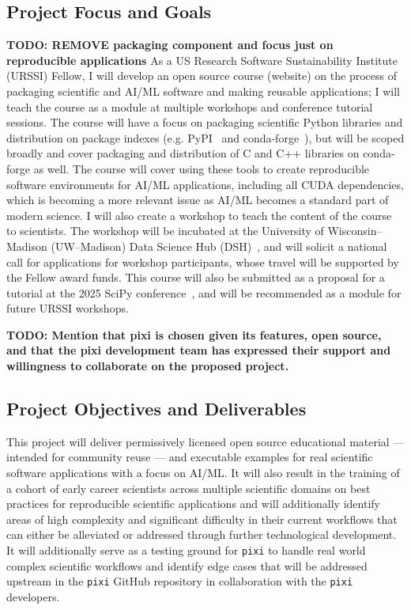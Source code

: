 \documentclass[letterpaper, 11pt]{article}
\newcommand{\institute}{UW--Madison}
\newcommand{\fullinstitute}{University of Wisconsin--Madison}
\newcommand{\fullprogram}{US Research Software Sustainability Institute}
\newcommand{\program}{URSSI}
\begin{document}
\subsection{Project Focus and Goals}
\textbf{TODO: REMOVE packaging component and focus just on reproducible applications}
As a \fullprogram{} (\program{}) Fellow, I will develop an open source course (website) on the process of packaging scientific and AI/ML software and making reusable applications; I will teach the course as a module at multiple workshops and conference tutorial sessions.
The course will have a focus on packaging scientific Python libraries and distribution on package indexes (e.g. PyPI~\cite{PyPI_website} and conda-forge~\cite{conda-forge_community}), but will be scoped broadly and cover packaging and distribution of C and C++ libraries on conda-forge as well.
The course will cover using these tools to create reproducible software environments for AI/ML applications, including all CUDA dependencies, which is becoming a more relevant issue as AI/ML becomes a standard part of modern science.
I will also create a workshop to teach the content of the course to scientists.
The workshop will be incubated at the \fullinstitute{} (\institute{}) Data Science Hub (DSH)~\cite{data_science_hub}, and will solicit a national call for applications for workshop participants, whose travel will be supported by the Fellow award funds.
This course will also be submitted as a proposal for a tutorial at the 2025 SciPy conference~\cite{scipy-2025}, and will be recommended as a module for future URSSI workshops.

\textbf{TODO: Mention that pixi is chosen given its features, open source, and that the pixi development team has expressed their support and willingness to collaborate on the proposed project.}

\subsection{Project Objectives and Deliverables}
This project will deliver permissively licensed open source educational material --- intended for community reuse --- and executable examples for real scientific software applications with a focus on AI/ML.
It will also result in the training of a cohort of early career scientists across multiple scientific domains on best practices for reproducible scientific applications and will additionally identify areas of high complexity and significant difficulty in their current workflows that can either be alleviated or addressed through further technological development.
It will additionally serve as a testing ground for \texttt{pixi} to handle real world complex scientific workflows and identify edge cases that will be addressed upstream in the \texttt{pixi} GitHub repository in collaboration with the \texttt{pixi} developers.
\end{document}
